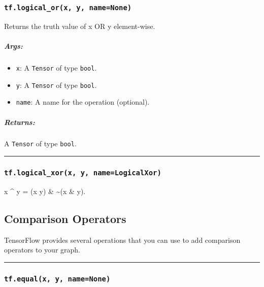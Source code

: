 \subsubsection{\texorpdfstring{\texttt{tf.logical\_or(x,\ y,\ name=None)}
}{tf.logical\_or(x, y, name=None) }}\label{tf.logicalux5forx-y-namenone}

Returns the truth value of x OR y element-wise.

\subparagraph{Args: }\label{args-7}

\begin{itemize}
\tightlist
\item
  \texttt{x}: A \texttt{Tensor} of type \texttt{bool}.
\item
  \texttt{y}: A \texttt{Tensor} of type \texttt{bool}.
\item
  \texttt{name}: A name for the operation (optional).
\end{itemize}

\subparagraph{Returns: }\label{returns-7}

A \texttt{Tensor} of type \texttt{bool}.

\begin{center}\rule{0.5\linewidth}{\linethickness}\end{center}

\subsubsection{\texorpdfstring{\texttt{tf.logical\_xor(x,\ y,\ name=\textquotesingle{}LogicalXor\textquotesingle{})}
}{tf.logical\_xor(x, y, name='LogicalXor') }}\label{tf.logicalux5fxorx-y-namelogicalxor}

x \^{} y = (x \textbar{} y) \& \textasciitilde{}(x \& y).

\subsection{Comparison Operators }\label{comparison-operators}

TensorFlow provides several operations that you can use to add
comparison operators to your graph.

\begin{center}\rule{0.5\linewidth}{\linethickness}\end{center}

\subsubsection{\texorpdfstring{\texttt{tf.equal(x,\ y,\ name=None)}
}{tf.equal(x, y, name=None) }}\label{tf.equalx-y-namenone}

